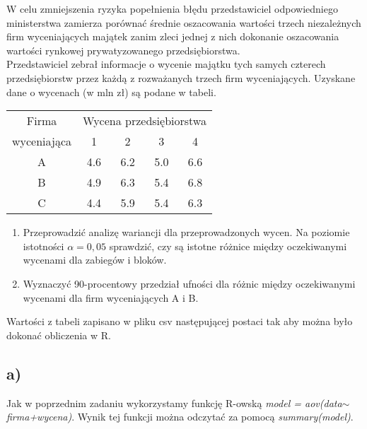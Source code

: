 \documentclass{article}
\begin{document}
W celu zmniejszenia ryzyka popełnienia błędu przedstawiciel odpowiedniego ministerstwa zamierza porównać średnie oszacowania wartości trzech niezależnych firm wyceniających majątek zanim zleci jednej z nich dokonanie oszacowania wartości rynkowej prywatyzowanego przedsiębiorstwa. \\

Przedstawiciel zebrał informacje o wycenie majątku tych samych czterech przedsiębiorstw przez każdą z rozważanych trzech firm wyceniających. Uzyskane dane o wycenach (w mln zł) są podane w tabeli.

\begin{center} \begin{tabular}{|c|c|c|c|c|} \hline
Firma & \multicolumn{4}{|c|}{Wycena przedsiębiorstwa} \\ 
wyceniająca & 1 & 2 & 3 & 4 \\ \hline
A & 4.6 & 6.2 & 5.0 & 6.6 \\
B & 4.9 & 6.3 & 5.4 & 6.8 \\ 
C & 4.4 & 5.9 & 5.4 & 6.3 \\ \hline
\end{tabular} \end{center}

\begin{enumerate}[label = \alph*)]
\item Przeprowadzić analizę wariancji dla przeprowadzonych wycen. Na poziomie istotności $\alpha=0,05$ sprawdzić, czy są istotne różnice między oczekiwanymi wycenami dla zabiegów i bloków. 
\item Wyznaczyć 90-procentowy przedział ufności dla różnic między oczekiwanymi wycenami dla firm wyceniających A i B.
\end{enumerate}

Wartości z tabeli zapisano w pliku csv następującej postaci tak aby można było dokonać obliczenia w R.
\begin{center}
\end{center}


\subsection{a)}
Jak w poprzednim zadaniu wykorzystamy funkcję R-owską \textit{model = aov(data$\sim$firma+wycena)}. Wynik tej funkcji można odczytać za pomocą \textit{summary(model)}.
\end{document}
